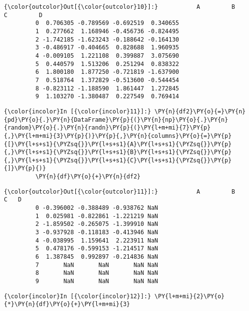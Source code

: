             \begin{Verbatim}[commandchars=\\\{\}]
{\color{outcolor}Out[{\color{outcolor}10}]:}           A         B         C         D
         0  0.706305 -0.789569 -0.692519  0.340655
         1  0.277662  1.168946 -0.456736 -0.824495
         2 -1.742185 -1.623243 -0.188642 -0.164130
         3 -0.486917 -0.404665  0.828688  1.960935
         4 -0.009105  1.221108  0.399887  3.075690
         5  0.440579  1.513206  0.251294  0.838322
         6  1.800180  1.877250 -0.721819 -1.637900
         7  0.518764  1.372829 -0.513600 -0.544454
         8 -0.823112 -1.188590  1.861447  1.272845
         9  1.103270 -1.380487  0.227549  0.769414
\end{Verbatim}
        
    \begin{Verbatim}[commandchars=\\\{\}]
{\color{incolor}In [{\color{incolor}11}]:} \PY{n}{df2}\PY{o}{=}\PY{n}{pd}\PY{o}{.}\PY{n}{DataFrame}\PY{p}{(}\PY{n}{np}\PY{o}{.}\PY{n}{random}\PY{o}{.}\PY{n}{randn}\PY{p}{(}\PY{l+m+mi}{7}\PY{p}{,}\PY{l+m+mi}{3}\PY{p}{)}\PY{p}{,}\PY{n}{columns}\PY{o}{=}\PY{p}{[}\PY{l+s+s1}{\PYZsq{}}\PY{l+s+s1}{A}\PY{l+s+s1}{\PYZsq{}}\PY{p}{,}\PY{l+s+s1}{\PYZsq{}}\PY{l+s+s1}{B}\PY{l+s+s1}{\PYZsq{}}\PY{p}{,}\PY{l+s+s1}{\PYZsq{}}\PY{l+s+s1}{C}\PY{l+s+s1}{\PYZsq{}}\PY{p}{]}\PY{p}{)}
         \PY{n}{df}\PY{o}{+}\PY{n}{df2}
\end{Verbatim}

            \begin{Verbatim}[commandchars=\\\{\}]
{\color{outcolor}Out[{\color{outcolor}11}]:}           A         B         C   D
         0 -0.396002 -0.388489 -0.938762 NaN
         1  0.025981 -0.822861 -1.221219 NaN
         2 -1.859502 -0.265075 -1.399910 NaN
         3 -0.937928 -0.118183 -0.413946 NaN
         4 -0.038995  1.159641  2.223911 NaN
         5  0.478176 -0.599153 -1.214517 NaN
         6  1.387845  0.992897 -0.214836 NaN
         7       NaN       NaN       NaN NaN
         8       NaN       NaN       NaN NaN
         9       NaN       NaN       NaN NaN
\end{Verbatim}
        
    \begin{Verbatim}[commandchars=\\\{\}]
{\color{incolor}In [{\color{incolor}12}]:} \PY{l+m+mi}{2}\PY{o}{*}\PY{n}{df}\PY{o}{+}\PY{l+m+mi}{3}
\end{Verbatim}


